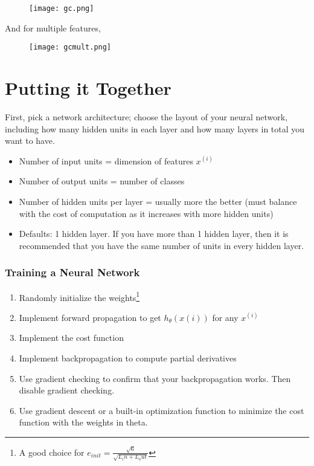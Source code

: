    \begin{figure}[h]
      \texttt{[image: gc.png]}
    \end{figure}

    And for multiple features,

    \begin{figure}[h]
      \texttt{[image: gcmult.png]}
    \end{figure}

  \section{Putting it Together}
    First, pick a network architecture; choose the layout of your neural network, including how many hidden units in each layer and how many layers in total you want to have.

    \begin{itemize}
      \item Number of input units = dimension of features $x^{(i)}$
      \item Number of output units = number of classes
      \item Number of hidden units per layer = usually more the better (must balance with the cost of computation as it increases with more hidden units)
      \item Defaults: 1 hidden layer. If you have more than 1 hidden layer, then it is recommended that you have the same number of units in every hidden layer.
    \end{itemize}

    \subsubsection{Training a Neural Network}
      \begin{enumerate}
        \item Randomly initialize the weights\footnote[3]{A good choice for $e_{init} = \frac{\sqrt{6}}{\sqrt{L_in + L_out}}$}
        \item Implement forward propagation to get $h_\theta(x(i))$ for any $x^{(i)}$
        \item Implement the cost function
        \item Implement backpropagation to compute partial derivatives
        \item Use gradient checking to confirm that your backpropagation works. Then disable gradient checking.
        \item Use gradient descent or a built-in optimization function to minimize the cost function with the weights in theta.
      \end{enumerate}

